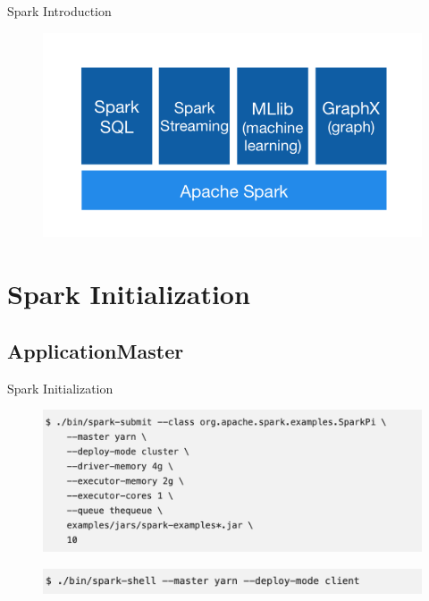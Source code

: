 \begin{frame}[plain,t]{Spark Introduction} %
	 \\  \vspace{2ex}
	
	\begin{figure}
		\centering
		\includegraphics[width=0.7\linewidth]{images/intr001}
		\label{fig:intr001}
	\end{figure}
	
\end{frame}
\section{Spark Initialization}
\subsection{ApplicationMaster}
\begin{frame}[plain,t]{Spark Initialization} %
	 \\  \vspace{2ex}
	\begin{figure}
		\centering
		\includegraphics[width=0.9\linewidth]{images/app016}
		\label{fig:app016}
	\end{figure}
	\begin{figure}
		\centering
		\includegraphics[width=0.9\linewidth]{images/app017}
		\label{fig:app017}
	\end{figure}
	
	
\end{frame}


